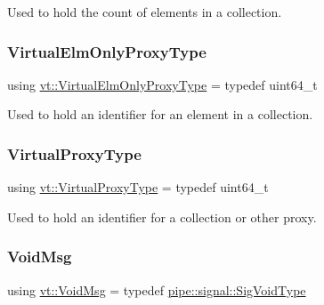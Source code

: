 Used to hold the count of elements in a collection. 

\mbox{\label{namespacevt_aa68633cd16822ae31c1cf521f817a23e}} 
\subsubsection{\texorpdfstring{Virtual\+Elm\+Only\+Proxy\+Type}{VirtualElmOnlyProxyType}}
{\footnotesize\ttfamily using \hyperlink{namespacevt_aa68633cd16822ae31c1cf521f817a23e}{vt\+::\+Virtual\+Elm\+Only\+Proxy\+Type} = typedef uint64\+\_\+t}



Used to hold an identifier for an element in a collection. 

\mbox{\label{namespacevt_a1b417dd5d684f045bb58a0ede70045ac}} 
\subsubsection{\texorpdfstring{Virtual\+Proxy\+Type}{VirtualProxyType}}
{\footnotesize\ttfamily using \hyperlink{namespacevt_a1b417dd5d684f045bb58a0ede70045ac}{vt\+::\+Virtual\+Proxy\+Type} = typedef uint64\+\_\+t}



Used to hold an identifier for a collection or other proxy. 

\mbox{\label{namespacevt_ae108c204035ac2513c8d09e6971a4a31}} 
\subsubsection{\texorpdfstring{Void\+Msg}{VoidMsg}}
{\footnotesize\ttfamily using \hyperlink{namespacevt_ae108c204035ac2513c8d09e6971a4a31}{vt\+::\+Void\+Msg} = typedef \hyperlink{namespacevt_1_1pipe_1_1signal_acbe257d1ae44f20fa9fd9b6ed3057caf}{pipe\+::signal\+::\+Sig\+Void\+Type}}

\mbox{\label{namespacevt_aa93398ea48f2cb6c188512250f7cc248}} 
